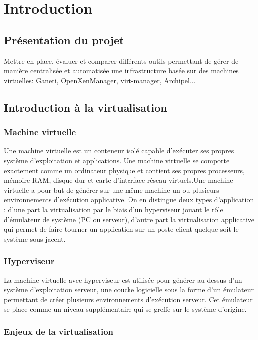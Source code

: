\chapter{Introduction}
\section{Présentation du projet}
Mettre en place, évaluer et comparer différents outils permettant de gérer de manière
centralisée et automatisée une infrastructure basée sur des machines virtuelles: Ganeti,
OpenXenManager, virt-manager, Archipel...
\section{Introduction à la virtualisation}
\subsection{Machine virtuelle}


Une machine virtuelle est un conteneur isolé capable d'exécuter
ses propres système d'exploitation et applications.
Une machine virtuelle se comporte exactement comme un ordinateur physique
et contient ses propres processeurs, mémoire RAM, disque dur et carte
d'interface réseau virtuels.Une machine virtuelle
a pour but de générer sur une même machine un ou plusieurs environnements
d'exécution applicative. On en distingue deux types d'application
: d'une part la virtualisation par le biais d'un hyperviseur jouant
le rôle d'émulateur de système (PC ou serveur), d'autre part la virtualisation
applicative qui permet de faire tourner un application sur un poste
client quelque soit le système sous-jacent.

\subsection{Hyperviseur }


La machine virtuelle avec hyperviseur est utilisée pour générer au
dessus d'un système d'exploitation serveur, une couche logicielle sous
la forme d'un émulateur permettant de créer plusieurs environnements
d'exécution serveur. Cet émulateur se place comme un niveau supplémentaire qui se greffe sur le système d'origine.
\newpage
\subsection{Enjeux de la virtualisation}


